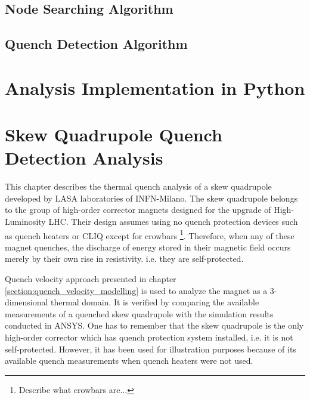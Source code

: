 \documentclass{article}
\begin{document}
\subsection{Node Searching Algorithm}
\label{subsection:node_searching_algorithm}


\subsection{Quench Detection Algorithm}
\label{subsection:quench_detection_algorithm}


\clearpage
\section{Analysis Implementation in Python}
\label{section:python_implementation}


\clearpage
\section{Skew Quadrupole Quench Detection Analysis}
\label{section:skew_quadrupole_quench_detection_analysis}

This chapter describes the thermal quench analysis of a skew quadrupole developed by LASA laboratories of INFN-Milano. The skew quadrupole belongs to the group of high-order corrector magnets designed for the upgrade of High-Luminosity LHC. Their design assumes using no quench protection devices such as quench heaters or CLIQ except for crowbars \footnote{Describe what crowbars are...}. Therefore, when any of these magnet quenches, the discharge of energy stored in their magnetic field occurs merely by their own rise in resistivity. i.e. they are self-protected.

Quench velocity approach presented in chapter \ref{section:quench_velocity_modelling} is used to analyze the magnet as a 3-dimensional thermal domain. It is verified by comparing the available measurements of a quenched skew quadrupole with the simulation results conducted in ANSYS. One has to remember that the skew quadrupole is the only high-order corrector which has quench protection system installed, i.e. it is not self-protected. However, it has been used for illustration purposes because of its available quench measurements when quench heaters were not used. 
\end{document}
